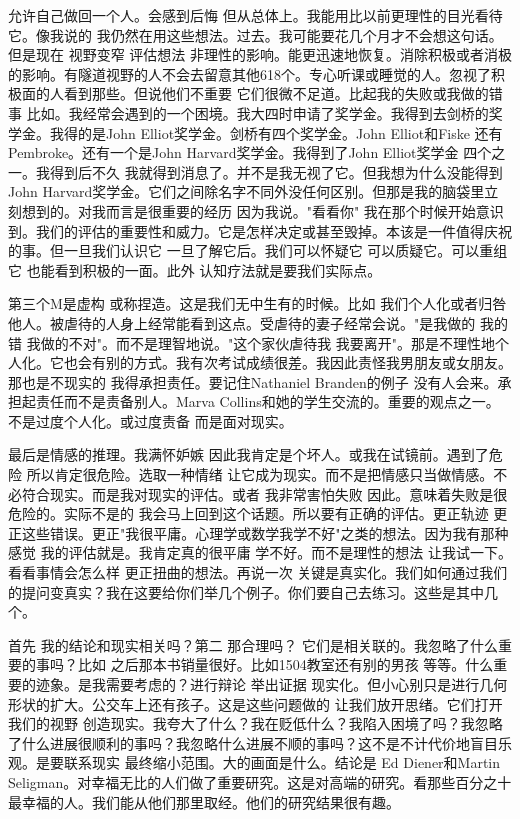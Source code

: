 允许自己做回一个人。会感到后悔 但从总体上。我能用比以前更理性的目光看待它。像我说的 我仍然在用这些想法。过去。我可能要花几个月才不会想这句话。但是现在 视野变窄 评估想法 非理性的影响。能更迅速地恢复。消除积极或者消极的影响。有隧道视野的人不会去留意其他618个。专心听课或睡觉的人。忽视了积极面的人看到那些。但说他们不重要 它们很微不足道。比起我的失败或我做的错事 比如。我经常会遇到的一个困境。我大四时申请了奖学金。我得到去剑桥的奖学金。我得的是John Elliot奖学金。剑桥有四个奖学金。John Elliot和Fiske 还有Pembroke。还有一个是John Harvard奖学金。我得到了John Elliot奖学金 四个之一。我得到后不久 我就得到消息了。并不是我无视了它。但我想为什么没能得到John Harvard奖学金。它们之间除名字不同外没任何区别。但那是我的脑袋里立刻想到的。对我而言是很重要的经历 因为我说。"看看你" 我在那个时候开始意识到。我们的评估的重要性和威力。它是怎样决定或甚至毁掉。本该是一件值得庆祝的事。但一旦我们认识它 一旦了解它后。我们可以怀疑它 可以质疑它。可以重组它 也能看到积极的一面。此外 认知疗法就是要我们实际点。 

第三个M是虚构 或称捏造。这是我们无中生有的时候。比如 我们个人化或者归咎他人。被虐待的人身上经常能看到这点。受虐待的妻子经常会说。"是我做的 我的错 我做的不对"。而不是理智地说。"这个家伙虐待我 我要离开"。那是不理性地个人化。它也会有别的方式。我有次考试成绩很差。我因此责怪我男朋友或女朋友。那也是不现实的 我得承担责任。要记住Nathaniel Branden的例子 没有人会来。承担起责任而不是责备别人。Marva Collins和她的学生交流的。重要的观点之一。不是过度个人化。或过度责备 而是面对现实。 

最后是情感的推理。我满怀妒嫉 因此我肯定是个坏人。或我在试镜前。遇到了危险 所以肯定很危险。选取一种情绪 让它成为现实。而不是把情感只当做情感。不必符合现实。而是我对现实的评估。或者 我非常害怕失败 因此。意味着失败是很危险的。实际不是的 我会马上回到这个话题。所以要有正确的评估。更正轨迹 更正这些错误。更正"我很平庸。心理学或数学我学不好"之类的想法。因为我有那种感觉 我的评估就是。我肯定真的很平庸 学不好。而不是理性的想法 让我试一下。看看事情会怎么样 更正扭曲的想法。再说一次 关键是真实化。我们如何通过我们的提问变真实？我在这要给你们举几个例子。你们要自己去练习。这些是其中几个。 

首先 我的结论和现实相关吗？第二 那合理吗？ 它们是相关联的。我忽略了什么重要的事吗？比如 之后那本书销量很好。比如1504教室还有别的男孩 等等。什么重要的迹象。是我需要考虑的？进行辩论 举出证据 现实化。但小心别只是进行几何形状的扩大。公交车上还有孩子。这是这些问题做的 让我们放开思绪。它们打开我们的视野 创造现实。我夸大了什么？我在贬低什么？我陷入困境了吗？我忽略了什么进展很顺利的事吗？我忽略什么进展不顺的事吗？这不是不计代价地盲目乐观。是要联系现实 最终缩小范围。大的画面是什么。结论是 Ed Diener和Martin Seligman。对幸福无比的人们做了重要研究。这是对高端的研究。看那些百分之十最幸福的人。我们能从他们那里取经。他们的研究结果很有趣。 

